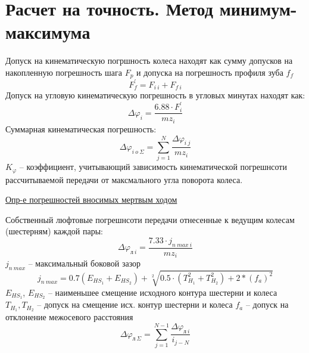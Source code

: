 \documentclass{article}
\begin{document}
\section{Расчет на точность. Метод минимум-максимума}

Допуск на кинематическую погршность колеса находят как сумму допусков на накопленную погрешность шага $F_p$
и допуска на погрешность профиля зуба $f_f$
$$
F_{f}^{'} = F_{i\:i} + F_{f\:i}
$$
Допуск на угловую кинематическую погрешность в угловых минутах находят как:
$$
\Delta \varphi_i = \frac{6.88 \cdot F_i^{'}}{m z_i} 
$$
Суммарная кинематическая погрешность:
$$
\Delta \varphi_{i\:o\:\Sigma} = \sum\limits_{j = 1}^{N} \frac{ \Delta \varphi_{i\:j}}{m z_i}
$$
$K_\varphi$ -- коэффициент, учитывающий зависимость кинематической погрешнсоти рассчитываемой передачи от максмального 
угла поворота колеса.

\underline{Опр-е погрешностей вносимых мертвым ходом}

Собственный люфтовые погрешнсоти передачи отнесенные к ведущим колесам (шестерням) каждой пары:
$$
\Delta \varphi_{л \: i} = \frac{7.33 \cdot j_{n\:max\:i}}{m z_i} 
$$
$j_{n\:max}$ -- максимальный боковой зазор
$$
j_{n\:max} = 0.7 \left (E_{HS_1} + E_{HS_2}\right) + \sqrt[2]{0.5\cdot\left(T_{H_1}^2 + T_{H_2}^2\right) + 2 * \left(f_a\right)^2}
$$
$E_{HS_1}$, $E_{HS_2}$ -- наименьшее смещение исходного контура шестерни и колеса
$T_{H_1}, T_{H_2}$ -- допуск на смещение исх. контур шестерни и колеса
$f_a$ -- допуск на отклонение межосевого расстояния
$$
\Delta \varphi_{л\:\Sigma} = \sum\limits_{j=1}^{N-1} \frac{ \Delta \varphi_{л \: i}}{i_{j - N}} 
$$
\end{document}
